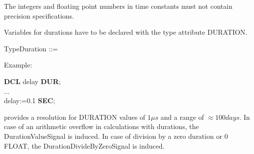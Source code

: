 The integers and floating point numbers in time constants must not
contain precision specifications.

Variables for durations have to be declared with the type attribute
DURATION.

TypeDuration ::=\\

Example:

{\bf DCL} delay {\bf DUR};\\
...\\
delay:=0.1 {\bf SEC};

\begin{added}
\OpenPEARL{} provides a resolution for DURATION values of $1\mu s$ and
a range of $\approx 100 days$.
In case of an arithmetic overflow in calculations with durations, the
DurationValueSignal is induced.
In case of division by a zero duration or 0 FLOAT, 
the DurationDivideByZeroSignal is induced.
\end{added}

